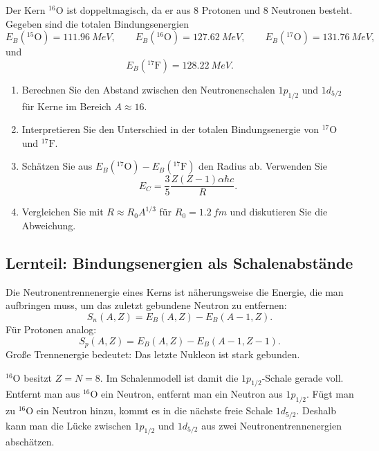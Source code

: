 \documentclass[11pt,a4paper]{scrartcl}
\newcommand{\isotope}[2]{^{#1}\mathrm{#2}}
\theoremstyle{definition}
\theoremstyle{plain}
\theoremstyle{remark}
\begin{document}
\begin{taskbox}
Der Kern $\isotope{16}{O}$ ist doppeltmagisch, da er aus 8 Protonen und 8 Neutronen besteht. Gegeben sind die totalen Bindungsenergien
\[
    E_B(\isotope{15}{O})=\SI{111.96}{MeV},
    \qquad
    E_B(\isotope{16}{O})=\SI{127.62}{MeV},
    \qquad
    E_B(\isotope{17}{O})=\SI{131.76}{MeV},
\]
und
\[
    E_B(\isotope{17}{F})=\SI{128.22}{MeV}.
\]
\begin{enumerate}[label=(\alph*)]
    \item Berechnen Sie den Abstand zwischen den Neutronenschalen $1p_{1/2}$ und $1d_{5/2}$ f\"ur Kerne im Bereich $A\approx 16$.
    \item Interpretieren Sie den Unterschied in der totalen Bindungsenergie von $\isotope{17}{O}$ und $\isotope{17}{F}$.
    \item Sch\"atzen Sie aus $E_B(\isotope{17}{O})-E_B(\isotope{17}{F})$ den Radius ab. Verwenden Sie
    \[
        E_C=\frac{3}{5}\frac{Z(Z-1)\alpha\hbar c}{R}.
    \]
    \item Vergleichen Sie mit $R\approx R_0A^{1/3}$ f\"ur $R_0=\SI{1.2}{fm}$ und diskutieren Sie die Abweichung.
\end{enumerate}
\end{taskbox}

\subsection{Lernteil: Bindungsenergien als Schalenabst\"ande}

\begin{definitionbox}[title=Trennenergie]
Die Neutronentrennenergie eines Kerns ist n\"aherungsweise die Energie, die man aufbringen muss, um das zuletzt gebundene Neutron zu entfernen:
\[
    S_n(A,Z)=E_B(A,Z)-E_B(A-1,Z).
\]
F\"ur Protonen analog:
\[
    S_p(A,Z)=E_B(A,Z)-E_B(A-1,Z-1).
\]
Gro\ss{}e Trennenergie bedeutet: Das letzte Nukleon ist stark gebunden.
\end{definitionbox}

\begin{learningbox}
$\isotope{16}{O}$ besitzt $Z=N=8$. Im Schalenmodell ist damit die $1p_{1/2}$-Schale gerade voll. Entfernt man aus $\isotope{16}{O}$ ein Neutron, entfernt man ein Neutron aus $1p_{1/2}$. F\"ugt man zu $\isotope{16}{O}$ ein Neutron hinzu, kommt es in die n\"achste freie Schale $1d_{5/2}$. Deshalb kann man die L\"ucke zwischen $1p_{1/2}$ und $1d_{5/2}$ aus zwei Neutronentrennenergien absch\"atzen.
\end{learningbox}
\end{document}
